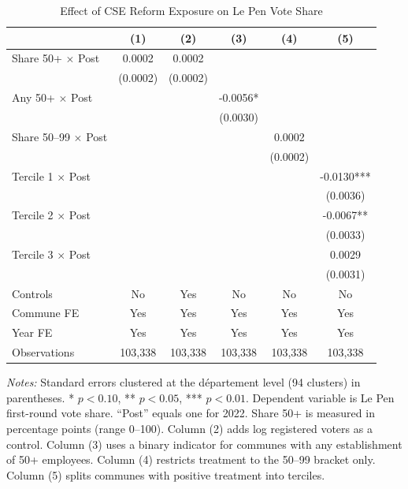 \begin{table}[H]
\centering
\caption{Effect of CSE Reform Exposure on Le Pen Vote Share}
\label{tab:main}
\begin{threeparttable}
\begin{tabular}{l *{5}{c}}
\toprule
& (1) & (2) & (3) & (4) & (5) \\
\midrule
Share 50+ $\times$ Post & 0.0002 & 0.0002 & & & \\
& (0.0002) & (0.0002) & & & \\[0.5em]
Any 50+ $\times$ Post & & & -0.0056* & & \\
& & & (0.0030) & & \\[0.5em]
Share 50--99 $\times$ Post & & & & 0.0002 & \\
& & & & (0.0002) & \\[0.5em]
Tercile 1 $\times$ Post & & & & & -0.0130*** \\
& & & & & (0.0036) \\
Tercile 2 $\times$ Post & & & & & -0.0067** \\
& & & & & (0.0033) \\
Tercile 3 $\times$ Post & & & & & 0.0029 \\
& & & & & (0.0031) \\[0.5em]
\midrule
Controls & No & Yes & No & No & No \\
Commune FE & Yes & Yes & Yes & Yes & Yes \\
Year FE & Yes & Yes & Yes & Yes & Yes \\
Observations & 103,338 & 103,338 & 103,338 & 103,338 & 103,338 \\
\bottomrule
\end{tabular}
\begin{tablenotes}[flushleft]
\small
\item \textit{Notes:} Standard errors clustered at the d\'epartement level (94 clusters) in parentheses. * $p<0.10$, ** $p<0.05$, *** $p<0.01$. Dependent variable is Le Pen first-round vote share. ``Post'' equals one for 2022. Share 50+ is measured in percentage points (range 0--100). Column (2) adds log registered voters as a control. Column (3) uses a binary indicator for communes with any establishment of 50+ employees. Column (4) restricts treatment to the 50--99 bracket only. Column (5) splits communes with positive treatment into terciles.
\end{tablenotes}
\end{threeparttable}
\end{table}
